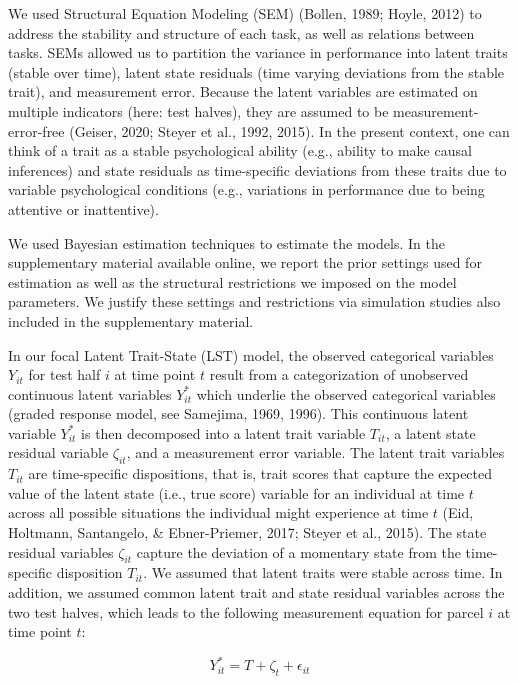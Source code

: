 \documentclass[
  man,floatsintext]{apa6}
\begin{document}
We used Structural Equation Modeling (SEM) (Bollen, 1989; Hoyle, 2012) to address the stability and structure of each task, as well as relations between tasks. SEMs allowed us to partition the variance in performance into latent traits (stable over time), latent state residuals (time varying deviations from the stable trait), and measurement error. Because the latent variables are estimated on multiple indicators (here: test halves), they are assumed to be measurement-error-free (Geiser, 2020; Steyer et al., 1992, 2015). In the present context, one can think of a trait as a stable psychological ability (e.g., ability to make causal inferences) and state residuals as time-specific deviations from these traits due to variable psychological conditions (e.g., variations in performance due to being attentive or inattentive).

We used Bayesian estimation techniques to estimate the models. In the supplementary material available online, we report the prior settings used for estimation as well as the structural restrictions we imposed on the model parameters. We justify these settings and restrictions via simulation studies also included in the supplementary material.

In our focal Latent Trait-State (LST) model, the observed categorical variables \(Y_{it}\) for test half \(i\) at time point \(t\) result from a categorization of unobserved continuous latent variables \(Y^*_{it}\) which underlie the observed categorical variables (graded response model, see Samejima, 1969, 1996). This continuous latent variable \(Y^*_{it}\) is then decomposed into a latent trait variable \(T_{it}\), a latent state residual variable \(\zeta_{it}\), and a measurement error variable. The latent trait variables \(T_{it}\) are time-specific dispositions, that is, trait scores that capture the expected value of the latent state (i.e., true score) variable for an individual at time \(t\) across all possible situations the individual might experience at time \(t\) (Eid, Holtmann, Santangelo, \& Ebner-Priemer, 2017; Steyer et al., 2015). The state residual variables \(\zeta_{it}\) capture the deviation of a momentary state from the time-specific disposition \(T_{it}\). We assumed that latent traits were stable across time. In addition, we assumed common latent trait and state residual variables across the two test halves, which leads to the following measurement equation for parcel \(i\) at time point \(t\):

\begin{equation}
Y^*_{it}= T + \zeta_t + \epsilon_{it}
\end{equation}
\end{document}
